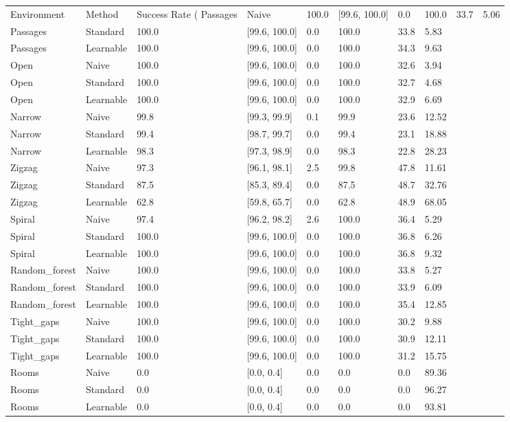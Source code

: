 \begin{tabular}{llllllll}
\toprule
Environment & Method & Success Rate (%
\midrule
Passages & Naive & 100.0 & [99.6, 100.0] & 0.0 & 100.0 & 33.7 & 5.06 \\
Passages & Standard & 100.0 & [99.6, 100.0] & 0.0 & 100.0 & 33.8 & 5.83 \\
Passages & Learnable & 100.0 & [99.6, 100.0] & 0.0 & 100.0 & 34.3 & 9.63 \\
Open & Naive & 100.0 & [99.6, 100.0] & 0.0 & 100.0 & 32.6 & 3.94 \\
Open & Standard & 100.0 & [99.6, 100.0] & 0.0 & 100.0 & 32.7 & 4.68 \\
Open & Learnable & 100.0 & [99.6, 100.0] & 0.0 & 100.0 & 32.9 & 6.69 \\
Narrow & Naive & 99.8 & [99.3, 99.9] & 0.1 & 99.9 & 23.6 & 12.52 \\
Narrow & Standard & 99.4 & [98.7, 99.7] & 0.0 & 99.4 & 23.1 & 18.88 \\
Narrow & Learnable & 98.3 & [97.3, 98.9] & 0.0 & 98.3 & 22.8 & 28.23 \\
Zigzag & Naive & 97.3 & [96.1, 98.1] & 2.5 & 99.8 & 47.8 & 11.61 \\
Zigzag & Standard & 87.5 & [85.3, 89.4] & 0.0 & 87.5 & 48.7 & 32.76 \\
Zigzag & Learnable & 62.8 & [59.8, 65.7] & 0.0 & 62.8 & 48.9 & 68.05 \\
Spiral & Naive & 97.4 & [96.2, 98.2] & 2.6 & 100.0 & 36.4 & 5.29 \\
Spiral & Standard & 100.0 & [99.6, 100.0] & 0.0 & 100.0 & 36.8 & 6.26 \\
Spiral & Learnable & 100.0 & [99.6, 100.0] & 0.0 & 100.0 & 36.8 & 9.32 \\
Random_forest & Naive & 100.0 & [99.6, 100.0] & 0.0 & 100.0 & 33.8 & 5.27 \\
Random_forest & Standard & 100.0 & [99.6, 100.0] & 0.0 & 100.0 & 33.9 & 6.09 \\
Random_forest & Learnable & 100.0 & [99.6, 100.0] & 0.0 & 100.0 & 35.4 & 12.85 \\
Tight_gaps & Naive & 100.0 & [99.6, 100.0] & 0.0 & 100.0 & 30.2 & 9.88 \\
Tight_gaps & Standard & 100.0 & [99.6, 100.0] & 0.0 & 100.0 & 30.9 & 12.11 \\
Tight_gaps & Learnable & 100.0 & [99.6, 100.0] & 0.0 & 100.0 & 31.2 & 15.75 \\
Rooms & Naive & 0.0 & [0.0, 0.4] & 0.0 & 0.0 & 0.0 & 89.36 \\
Rooms & Standard & 0.0 & [0.0, 0.4] & 0.0 & 0.0 & 0.0 & 96.27 \\
Rooms & Learnable & 0.0 & [0.0, 0.4] & 0.0 & 0.0 & 0.0 & 93.81 \\
\bottomrule
\end{tabular}
